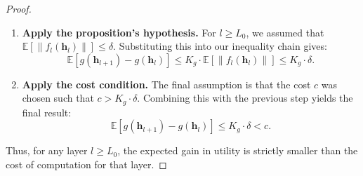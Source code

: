 \documentclass[10pt,a4paper]{amsart}
\newcommand{\E}{\mathbb{E}}
\newcommand{\h}{\mathbf{h}}
\begin{document}
\begin{proof}
\begin{enumerate}
    \item \textbf{Apply the proposition's hypothesis.} For $l \ge L_0$, we assumed that $\E[\|f_l(\h_l)\|] \le \delta$. Substituting this into our inequality chain gives:
    \[ \E[g(\h_{l+1}) - g(\h_l)] \le K_g \cdot \E[\|f_l(\h_l)\|] \le K_g \cdot \delta. \]

    \item \textbf{Apply the cost condition.} The final assumption is that the cost $c$ was chosen such that $c > K_g \cdot \delta$. Combining this with the previous step yields the final result:
    \[ \E[g(\h_{l+1}) - g(\h_l)] \le K_g \cdot \delta < c. \]
\end{enumerate}
Thus, for any layer $l \ge L_0$, the expected gain in utility is strictly smaller than the cost of computation for that layer.
\end{proof}
\end{document}
